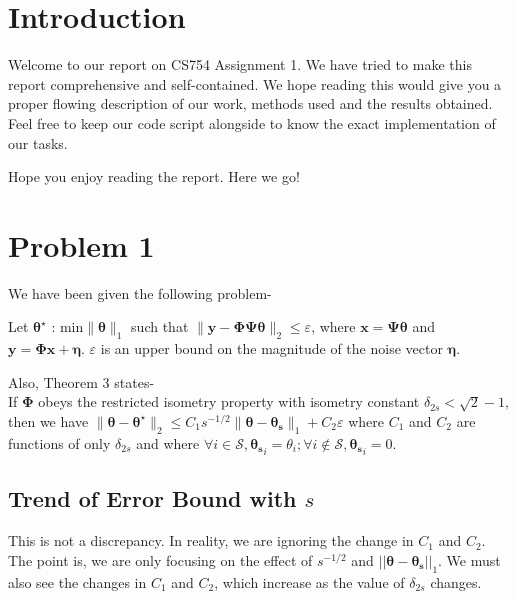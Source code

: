 \documentclass[a4paper,11pt]{article}
\numberwithin{definition}{section}
\numberwithin{mytheorem}{subsection}
\begin{document}

\date{Spring 2022}
\maketitle

\justifying
\tableofcontents

\newpage
\justifying
\section*{Introduction}

Welcome  to our report on CS754 Assignment 1. We have tried to make this report comprehensive and self-contained. We hope reading this would give you a proper flowing description of our work, methods used and the results obtained. Feel free to keep our code script alongside to know the exact implementation of our tasks. 

Hope you enjoy reading the report. Here we go!


\section{Problem 1}
We have been given the following problem-

Let $\boldsymbol{\theta^{\star}}$ : $\textrm{min} \|\boldsymbol{\theta}\|_1$ such that $\|\boldsymbol{y}-\boldsymbol{\Phi \Psi \theta}\|_2 \leq \varepsilon$, where $\boldsymbol{x} = \boldsymbol{\Psi \theta}$ and $\boldsymbol{y} = \boldsymbol{\Phi x} + \boldsymbol{\eta}$. $\varepsilon$ is an upper bound on the magnitude of the noise vector $\boldsymbol{\eta}$.

Also, Theorem 3 states-\\If $\boldsymbol{\Phi}$ obeys the restricted isometry property with isometry constant $\delta_{2s} < \sqrt{2}-1$, then we have $\|\boldsymbol{\theta} - \boldsymbol{\theta^{\star}}\|_2 \leq C_1 s^{-1/2}\|\boldsymbol{\theta}-\boldsymbol{\theta_s}\|_1 + C_2 \varepsilon$ where $C_1$ and $C_2$ are functions of only $\delta_{2s}$ and where $\forall i \in \mathcal{S}, \boldsymbol{\theta_s}_i = \theta_i; \forall i \notin \mathcal{S}, \boldsymbol{\theta_s}_i = 0$.

\subsection{Trend of Error Bound with $s$}
This is not a discrepancy. In reality, we are ignoring the change in $C_1$ and $C_2$. The point is, we are only focusing on the effect of $s^{-1/2}$ and $||\boldsymbol{\theta}-\boldsymbol{\theta_s}||_1$. We must also see the changes in $C_1$ and $C_2$, which increase as the value of $\delta_{2s}$ changes.
\end{document}
